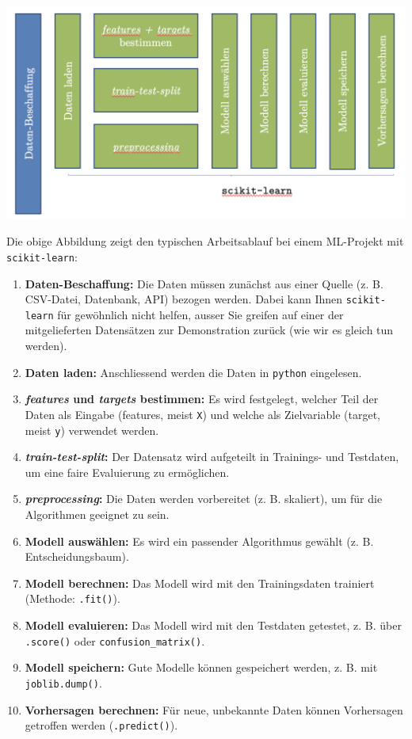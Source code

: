 \begin{lpu}
\vspace{1em}
\begin{center}
  \includegraphics[width=0.9\linewidth]{pipeline.png}
\end{center}

Die obige Abbildung zeigt den typischen Arbeitsablauf bei einem ML-Projekt mit \texttt{scikit-learn}:

\begin{enumerate}
  \item \textbf{Daten-Beschaffung:} Die Daten müssen zunächst aus einer Quelle (z. B. CSV-Datei, Datenbank, API) bezogen werden. Dabei kann Ihnen \texttt{scikit-learn} für gewöhnlich nicht helfen, ausser Sie greifen auf einer der mitgelieferten Datensätzen zur Demonstration zurück (wie wir es gleich tun werden).
  \item \textbf{Daten laden:} Anschliessend werden die Daten in \texttt{python} eingelesen.
  \item \textbf{\textit{features} und \textit{targets} bestimmen:} Es wird festgelegt, welcher Teil der Daten als Eingabe (features, meist \texttt{X}) und welche als Zielvariable (target, meist \texttt{y}) verwendet werden.
  \item \textbf{\textit{train-test-split}:} Der Datensatz wird aufgeteilt in Trainings- und Testdaten, um eine faire Evaluierung zu ermöglichen.
  \item \textbf{\textit{preprocessing}:} Die Daten werden vorbereitet (z. B. skaliert), um für die Algorithmen geeignet zu sein.
  \item \textbf{Modell auswählen:} Es wird ein passender Algorithmus gewählt (z. B. Entscheidungsbaum).
  \item \textbf{Modell berechnen:} Das Modell wird mit den Trainingsdaten trainiert (Methode: \texttt{.fit()}).
  \item \textbf{Modell evaluieren:} Das Modell wird mit den Testdaten getestet, z. B. über \texttt{.score()} oder \texttt{confusion\_matrix()}.
  \item \textbf{Modell speichern:} Gute Modelle können gespeichert werden, z. B. mit \texttt{joblib.dump()}.
  \item \textbf{Vorhersagen berechnen:} Für neue, unbekannte Daten können Vorhersagen getroffen werden (\texttt{.predict()}).
\end{enumerate}


\end{lpu}
